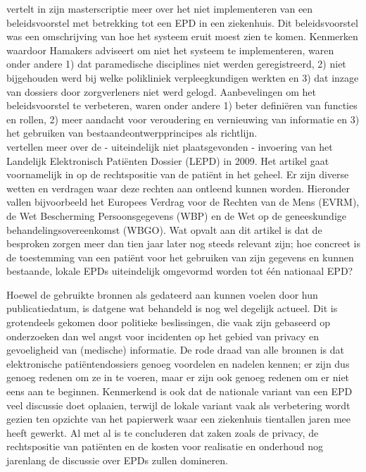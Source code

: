 \documentclass[a4paper, 10pt]{article}
\begin{document}
\citet{hamakers2007het} vertelt in zijn masterscriptie meer over het niet implementeren van een beleidsvoorstel met betrekking tot een EPD in een ziekenhuis. Dit beleidsvoorstel was een omschrijving van hoe het systeem eruit moest zien te komen. Kenmerken waardoor Hamakers adviseert om niet het systeem te implementeren, waren onder andere 1) dat paramedische disciplines niet werden geregistreerd, 2) niet bijgehouden werd bij welke polikliniek verpleegkundigen werkten en 3) dat inzage van dossiers door zorgverleners niet werd gelogd. Aanbevelingen om het beleidsvoorstel te verbeteren, waren onder andere 1) beter definiëren van functies en rollen, 2) meer aandacht voor veroudering en vernieuwing van informatie en 3) het gebruiken van bestaandeontwerpprincipes als richtlijn.\\

\citet{groothuis2007het} vertellen meer over de - uiteindelijk niet plaatsgevonden - invoering van het Landelijk Elektronisch Patiënten Dossier (LEPD) in 2009. Het artikel gaat voornamelijk in op de rechtspositie van de patiënt in het geheel. Er zijn diverse wetten en verdragen waar deze rechten aan ontleend kunnen worden. Hieronder vallen bijvoorbeeld het Europees Verdrag voor de Rechten van de Mens (EVRM), de Wet Bescherming Persoonsgegevens (WBP) en de Wet op de geneeskundige behandelingsovereenkomst (WBGO). Wat opvalt aan dit artikel is dat de besproken zorgen meer dan tien jaar later nog steeds relevant zijn; hoe concreet is de toestemming van een patiënt voor het gebruiken van zijn gegevens en kunnen bestaande, lokale EPDs uiteindelijk omgevormd worden tot één nationaal EPD?

\pagebreak

Hoewel de gebruikte bronnen als gedateerd aan kunnen voelen door hun publicatiedatum, is datgene wat behandeld is nog wel degelijk actueel. Dit is grotendeels gekomen door politieke beslissingen, die vaak zijn gebaseerd op onderzoeken dan wel angst voor incidenten op het gebied van privacy en gevoeligheid van (medische) informatie. De rode draad van alle bronnen is dat elektronische patiëntendossiers genoeg voordelen en nadelen kennen; er zijn dus genoeg redenen om ze in te voeren, maar er zijn ook genoeg redenen om er niet eens aan te beginnen. Kenmerkend is ook dat de nationale variant van een EPD veel discussie doet oplaaien, terwijl de lokale variant vaak als verbetering wordt gezien ten opzichte van het papierwerk waar een ziekenhuis tientallen jaren mee heeft gewerkt. Al met al is te concluderen dat zaken zoals de privacy, de rechtspositie van patiënten en de kosten voor realisatie en onderhoud nog jarenlang de discussie over EPDs zullen domineren.



\end{document}
